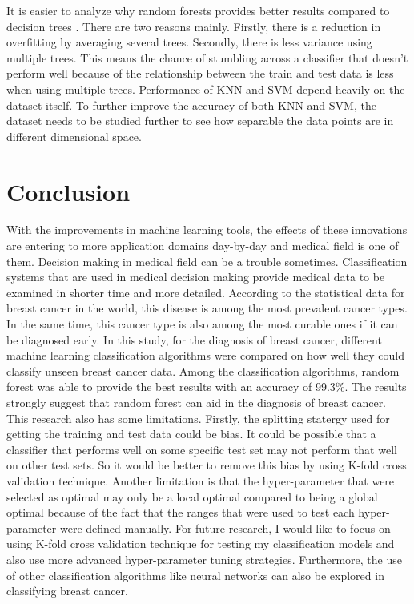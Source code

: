 \documentclass[journal]{IEEEtran}
\begin{document}
It is easier to analyze why random forests provides better results compared to decision trees \cite{adv}. There are two reasons mainly. Firstly, there is a reduction in overfitting by averaging several trees. Secondly, there is less variance using multiple trees. This means the chance of stumbling across a classifier that doesn’t perform well because of the relationship between the train and test data is less when using multiple trees. Performance of KNN and SVM depend heavily on the dataset itself. To further improve the accuracy of both KNN and SVM, the dataset needs to be studied further to see how separable the data points are in different dimensional space.


\section{Conclusion}
With the improvements in machine learning tools, the effects of these innovations are entering to more application domains day-by-day and medical field is one of them. Decision making in medical field can be a trouble sometimes. Classification systems that are used in medical decision making provide medical data to be examined in shorter time and more detailed. According to the statistical data for breast cancer in the world, this disease is among the most prevalent cancer types. In the same time, this cancer type is also among the most curable ones if it can be diagnosed early. In this study, for the diagnosis of breast cancer, different machine learning classification algorithms were compared on how well they could classify unseen breast cancer data. Among the classification algorithms, random forest was able to provide the best results with an accuracy of 99.3\%. The results strongly suggest that random forest can aid in the diagnosis of breast cancer. This research also has some limitations. Firstly, the splitting statergy used for getting the training and test data could be bias. It could be possible that a classifier that performs well on some specific test set may not perform that well on other test sets. So it would be better to remove this bias by using K-fold cross validation technique. Another limitation is that the hyper-parameter that were selected as optimal may only be a local optimal compared to being a global optimal because of the fact that the ranges that were used to test each hyper-parameter were defined manually. For future research, I would like to focus on using K-fold cross validation technique for testing my classification models and also use more advanced hyper-parameter tuning strategies. Furthermore, the use of other classification algorithms like neural networks can also be explored in classifying breast cancer. 
\end{document}
